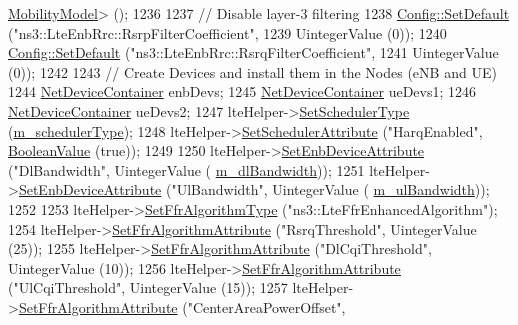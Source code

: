 \begin{DoxyCode}
      \hyperlink{classns3_1_1MobilityModel}{MobilityModel}> ();
1236 
1237   \textcolor{comment}{// Disable layer-3 filtering}
1238   \hyperlink{group__config_ga2e7882df849d8ba4aaad31c934c40c06}{Config::SetDefault} (\textcolor{stringliteral}{"ns3::LteEnbRrc::RsrpFilterCoefficient"},
1239                       UintegerValue (0));
1240   \hyperlink{group__config_ga2e7882df849d8ba4aaad31c934c40c06}{Config::SetDefault} (\textcolor{stringliteral}{"ns3::LteEnbRrc::RsrqFilterCoefficient"},
1241                       UintegerValue (0));
1242 
1243   \textcolor{comment}{// Create Devices and install them in the Nodes (eNB and UE)}
1244   \hyperlink{classns3_1_1NetDeviceContainer}{NetDeviceContainer} enbDevs;
1245   \hyperlink{classns3_1_1NetDeviceContainer}{NetDeviceContainer} ueDevs1;
1246   \hyperlink{classns3_1_1NetDeviceContainer}{NetDeviceContainer} ueDevs2;
1247   lteHelper->\hyperlink{classns3_1_1LteHelper_a8f86e55b8b80a81732c4b2df00fb25d5}{SetSchedulerType} (\hyperlink{classLteFrAreaTestCase_aa093fda7c4b63732d547c87952f52f05}{m\_schedulerType});
1248   lteHelper->\hyperlink{classns3_1_1LteHelper_a38f8c7f4592b31c0f3dedb53e7909742}{SetSchedulerAttribute} (\textcolor{stringliteral}{"HarqEnabled"},  
      \hyperlink{classns3_1_1BooleanValue}{BooleanValue} (\textcolor{keyword}{true}));
1249 
1250   lteHelper->\hyperlink{classns3_1_1LteHelper_ac42f0f3d6cd8473d810bfbbeb5d592e0}{SetEnbDeviceAttribute} (\textcolor{stringliteral}{"DlBandwidth"}, UintegerValue (
      \hyperlink{classLteFrAreaTestCase_a645fc2cea287afbd373f6d702152cf47}{m\_dlBandwidth}));
1251   lteHelper->\hyperlink{classns3_1_1LteHelper_ac42f0f3d6cd8473d810bfbbeb5d592e0}{SetEnbDeviceAttribute} (\textcolor{stringliteral}{"UlBandwidth"}, UintegerValue (
      \hyperlink{classLteFrAreaTestCase_afa54487d9f12658bbead39e1272f4d8c}{m\_ulBandwidth}));
1252 
1253   lteHelper->\hyperlink{classns3_1_1LteHelper_a035c6b03305c1511975362f80425b5fc}{SetFfrAlgorithmType} (\textcolor{stringliteral}{"ns3::LteFfrEnhancedAlgorithm"});
1254   lteHelper->\hyperlink{classns3_1_1LteHelper_a793d56e843a844428851e90752c5f130}{SetFfrAlgorithmAttribute} (\textcolor{stringliteral}{"RsrqThreshold"}, UintegerValue (25));
1255   lteHelper->\hyperlink{classns3_1_1LteHelper_a793d56e843a844428851e90752c5f130}{SetFfrAlgorithmAttribute} (\textcolor{stringliteral}{"DlCqiThreshold"}, UintegerValue (10));
1256   lteHelper->\hyperlink{classns3_1_1LteHelper_a793d56e843a844428851e90752c5f130}{SetFfrAlgorithmAttribute} (\textcolor{stringliteral}{"UlCqiThreshold"}, UintegerValue (15));
1257   lteHelper->\hyperlink{classns3_1_1LteHelper_a793d56e843a844428851e90752c5f130}{SetFfrAlgorithmAttribute} (\textcolor{stringliteral}{"CenterAreaPowerOffset"},

\end{DoxyCode}

